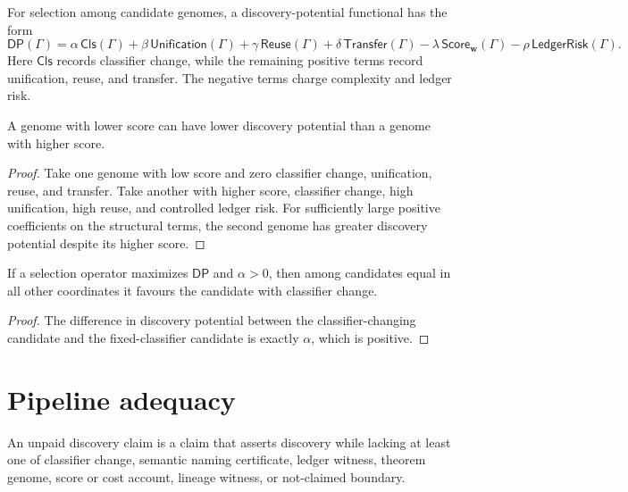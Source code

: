 \begin{definition}
\label{def:automated-discovery-potential}
For selection among candidate genomes, a discovery-potential functional has
the form
$$
\mathsf{DP}(\Gamma)=
\alpha\,\mathsf{Cls}(\Gamma)
+\beta\,\mathsf{Unification}(\Gamma)
+\gamma\,\mathsf{Reuse}(\Gamma)
+\delta\,\mathsf{Transfer}(\Gamma)
-\lambda\,\mathsf{Score}_{\mathbf w}(\Gamma)
-\rho\,\mathsf{LedgerRisk}(\Gamma).
$$
Here $\mathsf{Cls}$ records classifier change, while the remaining positive
terms record unification, reuse, and transfer. The negative terms charge
complexity and ledger risk.
\end{definition}

\begin{theorem}
\label{thm:automated-discovery-lowest-score-not-best-target}
A genome with lower score can have lower discovery potential than a genome
with higher score.
\end{theorem}
\begin{proof}
Take one genome with low score and zero classifier change, unification, reuse,
and transfer. Take another with higher score, classifier change, high
unification, high reuse, and controlled ledger risk. For sufficiently large
positive coefficients on the structural terms, the second genome has greater
discovery potential despite its higher score.
\end{proof}

\begin{theorem}
\label{thm:automated-discovery-selection-favours-classifier-change}
If a selection operator maximizes $\mathsf{DP}$ and $\alpha>0$, then among
candidates equal in all other coordinates it favours the candidate with
classifier change.
\end{theorem}
\begin{proof}
The difference in discovery potential between the classifier-changing
candidate and the fixed-classifier candidate is exactly $\alpha$, which is
positive.
\end{proof}

\section{Pipeline adequacy}
\label{sec:automated-discovery-pipeline-adequacy}

\begin{definition}
\label{def:automated-discovery-unpaid-discovery-claim}
An unpaid discovery claim is a claim that asserts discovery while lacking at
least one of classifier change, semantic naming certificate, ledger witness,
theorem genome, score or cost account, lineage witness, or not-claimed
boundary.
\end{definition}

